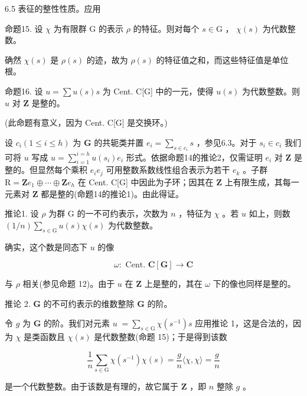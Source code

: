 \documentclass[10pt]{article}
\begin{document}
6.5 表征的整性性质。应用

命题15. 设 \(\chi\) 为有限群 G 的表示 \(\rho\) 的特征。则对每个 \(s \in  \mathrm{G}\) ， \(\chi \left( s\right)\) 为代数整数。

确然 \(\chi \left( s\right)\) 是 \(\rho \left( s\right)\) 的迹，故为 \(\rho \left( s\right)\) 的特征值之和，而这些特征值是单位根。

命题16. 设 \(u = \sum u\left( s\right) s\) 为 Cent. C[G] 中的一元，使得 \(u\left( s\right)\) 为代数整数。则 \(u\) 对 \(\mathbf{Z}\) 是整的。

(此命题有意义，因为 Cent. C[G] 是交换环。)

设 \({c}_{i}\left( {1 \leq  i \leq  h}\right)\) 为 \(\mathbf{G}\) 的共轭类并置 \({e}_{i} = \mathop{\sum }\limits_{{s \in  {c}_{i}}}s\) ，参见6.3。对于 \({s}_{i} \in  {c}_{i}\) 我们可将 \(u\) 写成 \(u = \mathop{\sum }\limits_{{i = 1}}^{{i = h}}u\left( {s}_{i}\right) {e}_{i}\) 形式。依据命题14的推论2，仅需证明 \({e}_{i}\) 对 \(\mathbf{Z}\) 是整的。但显然每个乘积 \({e}_{i}{e}_{j}\) 可用整数系数线性组合表示为若干 \({e}_{k}\) 。子群 \(\mathrm{R} = \mathbf{Z}{e}_{1} \oplus  \cdots  \oplus  \mathbf{Z}{e}_{h}\) 在 Cent. C[G] 中因此为子环；因其在 \(\mathbf{Z}\) 上有限生成，其每一元素对 \(\mathbf{Z}\) 都是整的(命题14的推论1)。由此得证。

推论1. 设 \(\rho\) 为群 \(\mathrm{G}\) 的一不可约表示，次数为 \(n\) ，特征为 \(\chi\) 。若 \(u\) 如上，则数 \(\left( {1/n}\right) \mathop{\sum }\limits_{{s \in  \mathrm{G}}}u\left( s\right) \chi \left( s\right)\) 为代数整数。

确实，这个数是同态下 \(u\) 的像

\[
\omega  : \text{ Cent. }\mathbf{C}\left\lbrack  \mathbf{G}\right\rbrack   \rightarrow  \mathbf{C}
\]

与 \(\rho\) 相关(参见命题 12)。由于 \(u\) 在 \(\mathbf{Z}\) 上是整的，其在 \(\omega\) 下的像也同样是整的。

推论 2. \(\mathbf{G}\) 的不可约表示的维数整除 \(\mathbf{G}\) 的阶。

令 \(g\) 为 \(\mathbf{G}\) 的阶。我们对元素 \(u \; = \mathop{\sum }\limits_{{s \in  \mathrm{G}}}\chi \left( {s}^{-1}\right) s\) 应用推论 1，这是合法的，因为 \(\chi\) 是类函数且 \(\chi \left( s\right)\) 是代数整数(命题 15)；于是得到该数

\[
\frac{1}{n}\mathop{\sum }\limits_{{s \in  \mathrm{G}}}\chi \left( {s}^{-1}\right) \chi \left( s\right)  = \frac{g}{n}\langle \chi ,\chi \rangle  = \frac{g}{n}
\]

是一个代数整数。由于该数是有理的，故它属于 \(\mathbf{Z}\) ，即 \(n\) 整除 \(g\) 。
\end{document}
